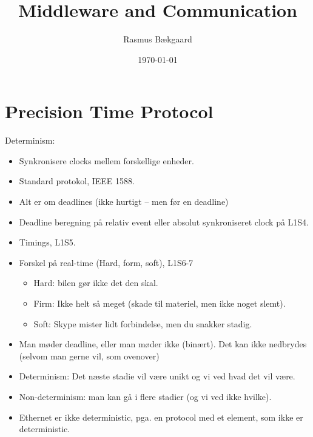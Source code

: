 \documentclass[oneside, 10pt]{article}
\title{Middleware and Communication}
\author{Rasmus Bækgaard}
\date{\today}
\begin{document}
\maketitle

\section{Precision Time Protocol}

Determinism:
\begin{itemize}
	\item Synkronisere clocks mellem forskellige enheder.
	\item Standard protokol, IEEE 1588.
	\item Alt er om deadlines (ikke hurtigt -- men før en deadline)
	\item Deadline beregning på relativ event eller absolut synkroniseret clock på L1S4.
	\item Timings, L1S5.
	\item Forskel på real-time (Hard, form, soft), L1S6-7
	\begin{itemize}
		\item Hard: bilen gør ikke det den skal.
		\item Firm: Ikke helt så meget (skade til materiel, men ikke noget slemt).
		\item Soft: Skype mister lidt forbindelse, men du snakker stadig.
	\end{itemize}

	\item Man møder deadline, eller man møder ikke (binært). Det kan ikke nedbrydes (selvom man gerne vil, som ovenover)
	\item Determinism: Det næste stadie vil være unikt og vi ved hvad det vil være.
	\item Non-determinism: man kan gå i flere stadier (og vi ved ikke hvilke).

	\item Ethernet er ikke deterministic, pga. en protocol med et element, som ikke er deterministic.
\end{itemize}
\end{document}
